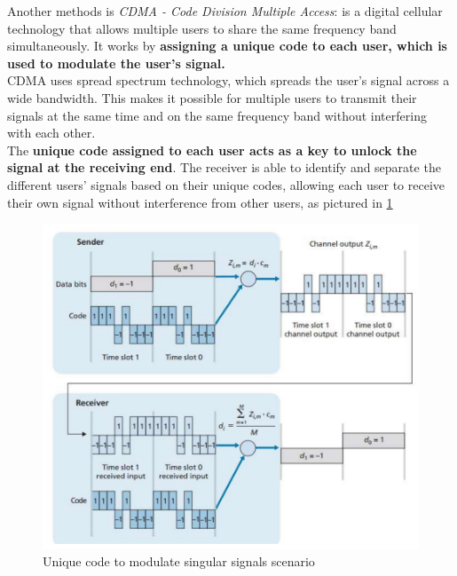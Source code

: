 \documentclass[10pt,a4paper]{report}
\theoremstyle{definition}
\begin{document}
Another methods is \textit{CDMA - Code Division Multiple Access}: is a digital cellular technology that allows multiple users to share the same frequency band simultaneously. It works by \textbf{assigning a unique code to each user, which is used to modulate the user's signal.}\\
CDMA uses spread spectrum technology, which spreads the user's signal across a wide bandwidth. This makes it possible for multiple users to transmit their signals at the same time and on the same frequency band without interfering with each other.\\
The \textbf{unique code assigned to each user acts as a key to unlock the signal at the receiving end}. The receiver is able to identify and separate the different users' signals based on their unique codes, allowing each user to receive their own signal without interference from other users, as pictured in \ref{coded-signals}
\begin{figure}[h!]
	\centering\includegraphics[scale=0.70]{images/Pasted image 20230301173902.png}
	\caption{Unique code to modulate singular signals scenario}
	\label{coded-signals}
\end{figure}
\end{document}
